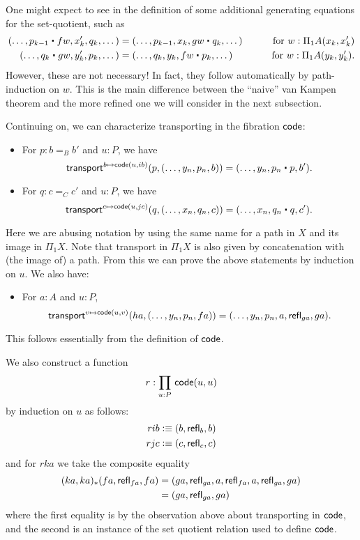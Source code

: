 \begin{rmk}\label{rmk:naive}
  One might expect to see in the definition of \code some additional generating equations for the set-quotient, such as
  \begin{alignat*}{2}
    (\dots, p_{k-1} \ct fw, x_{k}', q_{k}, \dots) &=
    (\dots, p_{k-1}, x_{k}, gw \ct q_{k}, \dots)
    & \qquad\text{for } w:\Pi_1A(x_{k},x_{k}')\\
    (\dots, q_k \ct gw, y_k', p_k, \dots) &=
    (\dots, q_k, y_k, fw \ct p_k, \dots)
    & \qquad\text{for } w:\Pi_1A(y_k, y_k').
  \end{alignat*}
  However, these are not necessary!
  In fact, they follow automatically by path-induction on $w$.
  This is the main difference between the ``naive'' van Kampen theorem and the more refined one we will consider in the next subsection.
\end{rmk}

Continuing on, we can characterize transporting in the fibration $\mathsf{code}$:
\begin{itemize}
\item For $p:b=_B b'$ and $u:P$, we have
  \[ \mathsf{transport}^{b\mapsto \code(u,ib)}(p, (\dots, y_n,p_n,b))
  = (\dots,y_n,p_n\ct p,b').
  \]
\item For $q:c=_C c'$ and $u:P$, we have
  \[ \mathsf{transport}^{c\mapsto \code(u,jc)}(q, (\dots, x_n,q_n,c))
  = (\dots,x_n,q_n\ct q,c').
  \]
\end{itemize}
Here we are abusing notation by using the same name for a path in $X$ and its image in $\Pi_1X$.
Note that transport in $\Pi_1X$ is also given by concatenation with (the image of) a path.
From this we can prove the above statements by induction on $u$.
We also have:
\begin{itemize}
\item For $a:A$ and $u:P$,
  \[ \mathsf{transport}^{v\mapsto \mathsf{code}(u,v)}(ha, (\dots, y_n,p_n,fa))
  = (\dots,y_n,p_n,a,\mathsf{refl}_{ga},ga).
  \]
\end{itemize}
This follows essentially from the definition of $\mathsf{code}$.

We also construct a function
\[ r : \prd{u:P} \code(u,u) \]
by induction on $u$ as follows:
\begin{align*}
  rib &\vcentcolon\equiv (b,\mathsf{refl}_{b},b)\\
  rjc &\vcentcolon\equiv (c,\mathsf{refl}_{c},c)
\end{align*}
and for $rka$ we take the composite equality
\begin{align*}
  (ka,ka)_* (fa,\mathsf{refl}_{fa},fa)
  &= (ga,\mathsf{refl}_{ga},a,\mathsf{refl}_{fa},a,\mathsf{refl}_{ga},ga) \\
  &= (ga,\mathsf{refl}_{ga},ga)
\end{align*}
where the first equality is by the observation above about transporting in $\mathsf{code}$, and the second is an instance of the set quotient relation used to define $\mathsf{code}$.

